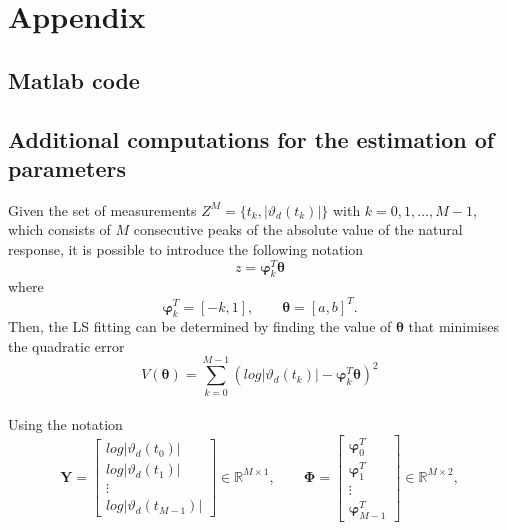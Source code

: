 \appendix
\section{Appendix}



\subsection{Matlab code}







\pagebreak
\subsection{Additional computations for the estimation of parameters} \label{estimation}
Given the set of measurements \(Z^M=\{t_k , |\vartheta_d(t_k)|\}\) with \(k = 0,1,...,M-1\), which consists of \(M\) consecutive peaks of the absolute value of the natural response, it is possible to introduce the following notation
\begin{equation}
    z = \boldsymbol{\varphi}_k^T\boldsymbol{\theta}
\end{equation}
where
 \begin{equation}
    \label{eq : vectors}
        \boldsymbol{\varphi}_{k}^T = [-k, 1], \qquad 
        \boldsymbol{\theta} = [a, b]^T.
    \end{equation}
Then, the LS fitting can be determined by finding the value of \(\boldsymbol{\theta}\) that minimises the quadratic error
\begin{equation}
\label{eq:cost}
    V(\boldsymbol{\theta}) = \sum_{k=0}^{M-1} (log|\vartheta_d(t_k)|-\boldsymbol{\varphi}_{k}^T \boldsymbol{\theta})^2
\end{equation}
\\Using the notation
\begin{equation}
    \boldsymbol{Y} =
    \begin{bmatrix} log|\vartheta_d(t_0)| \\ log|\vartheta_d(t_1)|\\ \vdots \\ log|\vartheta_d(t_{M-1})|
    \end{bmatrix}
    \in \mathbb{R}^{M\times1},\qquad
    \boldsymbol{\Phi} = 
    \begin{bmatrix} \boldsymbol{\varphi}_{0}^T \\ \boldsymbol{\varphi}_{1}^T \\ \vdots \\ \boldsymbol{\varphi}_{M-1}^T  
    \end{bmatrix}
    \in \mathbb{R}^{M\times2},
\end{equation}

